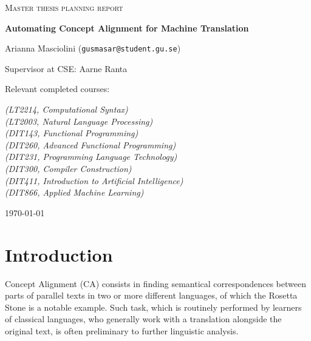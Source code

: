 \documentclass{article}
\begin{document}
\begin{titlepage}
  

\centering
  
  
{\scshape\LARGE Master thesis planning report\\}
  
\vspace{0.5cm}
  
{\huge\bfseries Automating Concept Alignment for Machine Translation\\}

\vspace{2cm}
  
{\Large Arianna Masciolini (\texttt{gusmasar@student.gu.se})\\}

\vspace{0.2cm}
  
{\large Supervisor at CSE: Aarne Ranta\\}
  
\vspace{1.5cm}
  
{\large Relevant completed courses:\par}
  
{\itshape (LT2214, Computational Syntax)\\}
{\itshape (LT2003, Natural Language Processing)\\}
{\itshape (DIT143, Functional Programming)\\}
{\itshape (DIT260, Advanced Functional Programming)\\}
{\itshape (DIT231, Programming Language Technology)\\}
{\itshape (DIT300, Compiler Construction)\\}
{\itshape (DIT411, Introduction to Artificial Intelligence)\\}
{\itshape (DIT866, Applied Machine Learning)\\}
  
\vfill
\vfill
  
{\large \today\\} 


\end{titlepage}

\section{Introduction}
Concept Alignment (CA) consists in finding semantical correspondences between parts of parallel texts in two or more different languages, of which the Rosetta Stone is a notable example. 
Such task, which is routinely performed by learners of classical languages, who generally work with a translation alongside the original text, is often preliminary to further linguistic analysis.
\end{document}
